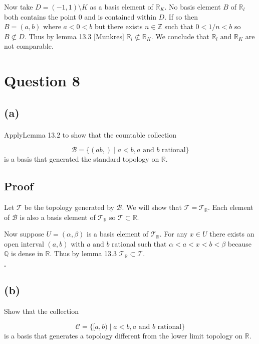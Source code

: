 \documentclass[11pt, oneside]{article}   	%
\newcommand{\R}{\mathbb{R}}
\newcommand{\bb}[1]{\mathbb{#1}}
\newcommand{\scr}[1]{\mathscr{#1}}
\newcommand{\tand}{\text{ and }}
\newcommand{\twhere}{\text{ where }}
\newcommand{\qed}{\begin{center}
$\square$
\end{center}}
\begin{document}
Now take $D = (-1,1) \setminus K$ as a basis element of $\R_K$. No basis element $B$ of $\R_l$ both contains the point 0 and is contained within $D$. If so then $B=(a,b) \twhere a<0<b$ but there exists $n \in \bb{Z}$ such that $0 < 1/n < b$ so $B \not \subset D$. Thus by lemma 13.3 [Munkres] $\R_l \not\subset \R_K$. We conclude that $\R_l \tand \R_K$ are not comparable.


\section*{Question 8}

\subsection*{(a)}
\paragraph{}

ApplyLemma 13.2 to show that the countable collection 

\begin{equation*}
\scr{B} = \{(ab,) \mid a< b, a \tand b \text{ rational} \}
\end{equation*}
is a basis that generated the standard topology on $\R$.


\subsection*{Proof}

Let $\scr{T}$ be the topology generated by $\scr{B}$. We will show that $\scr{T} = \scr{T}_\R$. Each element of $\scr{B}$ is also a basis element of $\scr{T}_\R$ so $ \scr{T} \subset \R$.

 Now suppose $U = (\alpha,\beta)$ is a basis element of $\scr{T}_\R$. For any $ x \in U$ there exists an open interval $(a,b)$ with  $a \tand b$ rational such that $\alpha < a < x < b < \beta$ because $\bb{Q}$ is dense in $\R$. Thus by lemma 13.3 $\scr{T}_\R \subset \scr{T}$. \qed
 
 \subsection*{(b)}
 
 Show that the collection
 
 \begin{equation*}
 \scr{C} = \{[a,b) \mid a < b, a \tand b \text{ rational} \}
 \end{equation*}
 is a basis that generates a topology different from the lower limit topology on $\R$.
 
\end{document}
